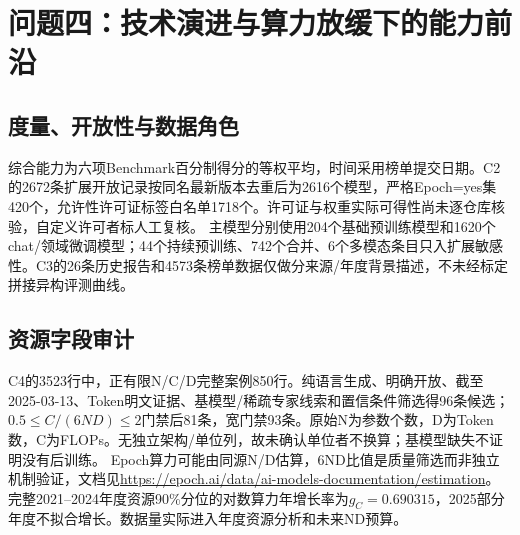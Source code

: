 \section{问题四：技术演进与算力放缓下的能力前沿}
\subsection{度量、开放性与数据角色}
综合能力为六项Benchmark百分制得分的等权平均，时间采用榜单提交日期。C2的2672条扩展开放记录按同名最新版本去重后为2616个模型，严格Epoch=yes集420个，允许性许可证标签白名单1718个。许可证与权重实际可得性尚未逐仓库核验，自定义许可者标人工复核。
主模型分别使用204个基础预训练模型和1620个chat/领域微调模型；44个持续预训练、742个合并、6个多模态条目只入扩展敏感性。C3的26条历史报告和4573条榜单数据仅做分来源/年度背景描述，不未经标定拼接异构评测曲线。

\subsection{资源字段审计}
C4的3523行中，正有限N/C/D完整案例850行。纯语言生成、明确开放、截至2025-03-13、Token明文证据、基模型/稀疏专家线索和置信条件筛选得96条候选；$0.5\le C/(6ND)\le2$门禁后81条，宽门禁93条。原始N为参数个数，D为Token数，C为FLOPs。无独立架构/单位列，故未确认单位者不换算；基模型缺失不证明没有后训练。
Epoch算力可能由同源N/D估算，6ND比值是质量筛选而非独立机制验证，文档见\url{https://epoch.ai/data/ai-models-documentation/estimation}。完整2021--2024年度资源90\%分位的对数算力年增长率为$g_C=0.690315$，2025部分年度不拟合增长。数据量实际进入年度资源分析和未来ND预算。

